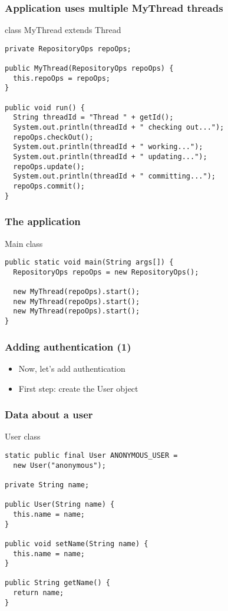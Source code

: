 \documentclass{beamer}
\begin{document}
\begin{frame}[fragile]
  \frametitle{Application uses multiple MyThread threads}

\begin{block}{class MyThread extends Thread}
\begin{verbatim}
private RepositoryOps repoOps;

public MyThread(RepositoryOps repoOps) {
  this.repoOps = repoOps;
}

public void run() {
  String threadId = "Thread " + getId();
  System.out.println(threadId + " checking out...");
  repoOps.checkOut();
  System.out.println(threadId + " working...");
  System.out.println(threadId + " updating...");
  repoOps.update();
  System.out.println(threadId + " committing...");
  repoOps.commit();
}
\end{verbatim}
\end{block}

\end{frame}

\begin{frame}[fragile]
  \frametitle{The application}

\begin{block}{Main class}
\begin{verbatim}
public static void main(String args[]) {
  RepositoryOps repoOps = new RepositoryOps();

  new MyThread(repoOps).start();
  new MyThread(repoOps).start();
  new MyThread(repoOps).start();
}
\end{verbatim}
\end{block}

\end{frame}

\begin{frame}
  \frametitle{Adding authentication (1)}

\begin{itemize}
\item Now, let's add authentication
\pause
\item First step: create the User object
\end{itemize}

\end{frame}

\begin{frame}[fragile]
  \frametitle{Data about a user}

\begin{block}{User class}
\begin{verbatim}
static public final User ANONYMOUS_USER =
  new User("anonymous");

private String name;

public User(String name) {
  this.name = name;
}

public void setName(String name) {
  this.name = name;
}

public String getName() {
  return name;
}
\end{verbatim}
\end{block}

\end{frame}
\end{document}
